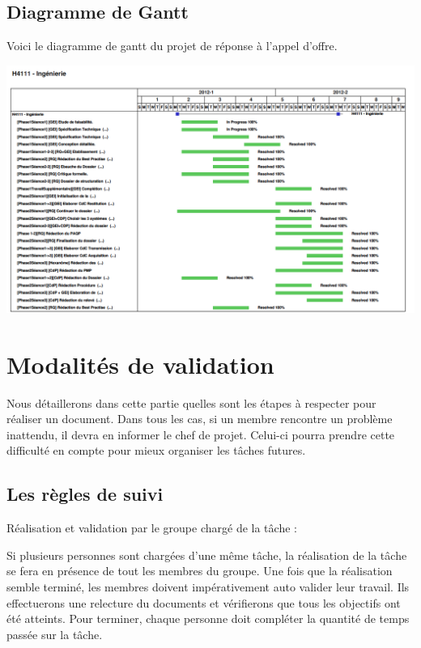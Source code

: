 \subsection{Diagramme de Gantt}
Voici le diagramme de gantt du projet de réponse à l'appel d'offre. 
\begin {center}
\includegraphics[width=\textwidth]{png/Gantt.png}
\end {center}

    
    \section{Modalités de validation}

Nous détaillerons dans cette partie quelles sont les étapes à respecter pour réaliser un document. Dans tous les cas, si un membre rencontre un problème inattendu, il devra en informer le chef de projet. Celui-ci pourra prendre cette difficulté en compte pour mieux organiser les tâches futures.

     \subsection{Les règles de suivi}

Réalisation et validation par le groupe chargé de la tâche :

Si plusieurs personnes sont chargées d'une même tâche, la réalisation de la tâche se fera en présence de tout les membres du groupe. Une fois que la réalisation semble terminé, les membres doivent impérativement auto valider leur travail. Ils effectuerons une relecture du documents et vérifierons que tous les objectifs ont été atteints. Pour terminer, chaque personne doit compléter la quantité de temps passée sur la tâche.

